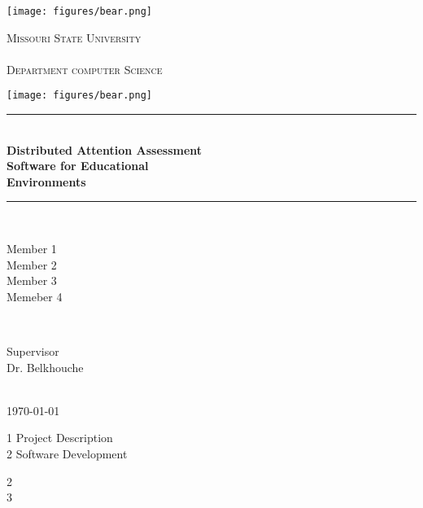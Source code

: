 \documentclass[12pt]{article}
\begin{document}
\begin{titlepage}

\newcommand{\HRule}{\rule{\linewidth}{0.5mm}} 

\begin{minipage}[b]{0.12\textwidth}
\texttt{[image: figures/bear.png]}
\end{minipage}
\begin{minipage}[b]{0.72\textwidth}
\centering
\textsc{\LARGE Missouri State University\\~\\Department computer Science}
\end{minipage}
\begin{minipage}[b]{0.12\textwidth}
\texttt{[image: figures/bear.png]}
\end{minipage}
\vspace{1.0cm}
\center
\HRule \\[0.4cm]
{ \huge \bfseries Distributed Attention Assessment\\ Software for Educational\\[0.4cm] Environments}\\[0.4cm] 
\HRule \\[1.5cm]


\begin{minipage}{0.4\textwidth}
\begin{flushleft} \large
Member 1 \\ Member 2 \\ Member 3 \\ Memeber 4  
\end{flushleft}
\end{minipage}
~
\begin{minipage}{0.4\textwidth}
\begin{flushright} \large
Supervisor \\ 
Dr. Belkhouche
\end{flushright}
\end{minipage}\\[2cm]

{\large \today}\\[2cm] 

\end{titlepage}

\newpage
\tableofcontents
\begin{minipage}{0.4\textwidth}
\begin{flushleft} \large
1   Project Description \\ 2    Software Development
\end{flushleft}
\end{minipage}
\begin{minipage}{0.4\textwidth}
\begin{flushright} \large
2 \\ 3
\end{flushright}
\end{minipage}\\
\newpage
\end{document}
